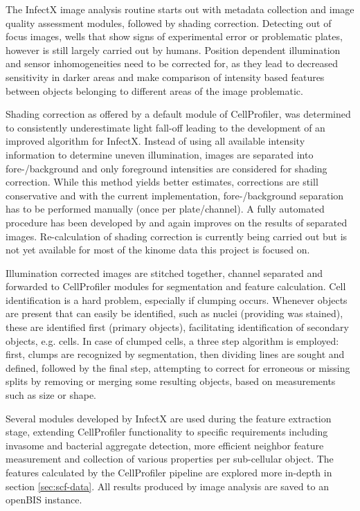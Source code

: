 The InfectX image analysis routine starts out with metadata collection and image quality assessment modules, followed by shading correction. Detecting out of focus images, wells that show signs of experimental error or problematic plates, however is still largely carried out by humans. Position dependent illumination and sensor inhomogeneities need to be corrected for, as they lead to decreased sensitivity in darker areas and make comparison of intensity based features between objects belonging to different areas of the image problematic.

Shading correction as offered by a default module of CellProfiler, was determined to consistently underestimate light fall-off leading to the development of an improved algorithm for InfectX. Instead of using all available intensity information to determine uneven illumination, images are separated into fore-/background and only foreground intensities are considered for shading correction. While this method yields better estimates, corrections are still conservative and with the current implementation, fore-/background separation has to be performed manually (once per plate/channel). A fully automated procedure has been developed by \citet{Smith2015} and again improves on the results of separated images. Re-calculation of shading correction is currently being carried out but is not yet available for most of the kinome data this project is focused on.

Illumination corrected images are stitched together, channel separated and forwarded to CellProfiler modules for segmentation and feature calculation. Cell identification is a hard problem, especially if clumping occurs. Whenever objects are present that can easily be identified, such as nuclei (providing  was stained), these are identified first (primary objects), facilitating identification of secondary objects, e.g. cells. In case of clumped cells, a three step algorithm is employed: first, clumps are recognized by segmentation, then dividing lines are sought and defined, followed by the final step, attempting to correct for erroneous or missing splits by removing or merging some resulting objects, based on measurements such as size or shape.

Several modules developed by InfectX are used during the feature extraction stage, extending CellProfiler functionality to specific requirements including invasome and bacterial aggregate detection, more efficient neighbor feature measurement and collection of various properties per sub-cellular object. The features calculated by the CellProfiler pipeline are explored more in-depth in section \ref{sec:scf-data}. All results produced by image analysis are saved to an openBIS instance.

